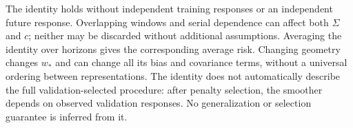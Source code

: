 The identity holds without independent training responses or an independent
future response.  Overlapping windows and serial dependence can affect both
$\Sigma$ and $c$; neither may be discarded without additional assumptions.
Averaging the identity over horizons gives the corresponding average risk.
Changing geometry changes $w_*$ and can change all its bias and covariance
terms, without a universal ordering between representations.  The identity
does not automatically describe the full validation-selected procedure:
after penalty selection, the smoother depends on observed validation responses.
No generalization or selection guarantee is inferred from it.
